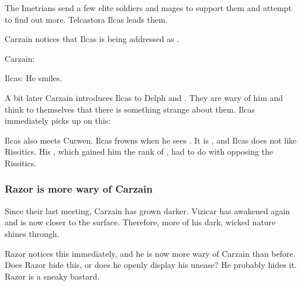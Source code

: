 The Imetrians send a few elite soldiers and mages to support them and attempt to find out more. Telcastora Ilcas leads them. 

Carzain notices that Ilcas is being addressed as . 

\begin{prose}
  Carzain: 
  
  Ilcas: 
  He smiles. 
\end{prose}

A bit later Carzain introduces Ilcas to Delph and \Tsekkect. 
They are wary of him and think to themselves that there is something strange about them. 
Ilcas immediately picks up on this: 
\begin{prose}
\end{prose}

Ilcas also meets Curwen. 
Ilcas frowns when he sees . 
It is , and Ilcas does not like Rissitics. 
His , which gained him the rank of \Retaxis, had to do with opposing the Rissitics. 





\subsubsection{Razor is more wary of Carzain}
Since their last meeting, Carzain has grown darker. 
Vizicar has awakened again and is now closer to the surface. 
Therefore, more of his dark, wicked \sathariah{} nature shines through. 

Razor notices this immediately, and he is now more wary of Carzain than before. 
Does Razor hide this, or does he openly display his unease? 
He probably hides it. 
Razor is a sneaky bastard. 









